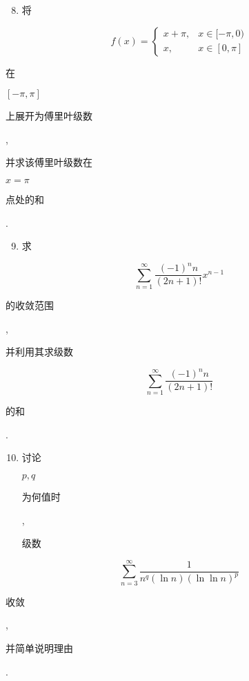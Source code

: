 \documentclass[10pt]{article}
\begin{document}
\begin{enumerate}
  \setcounter{enumi}{7}
  \item \begin{CJK}{UTF8}{mj}将\end{CJK}
\end{enumerate}
$$
f(x)= \begin{cases}x+\pi, & x \in[-\pi, 0) \\ x, & x \in[0, \pi]\end{cases}
$$
\begin{CJK}{UTF8}{mj}在\end{CJK} $[-\pi, \pi]$ \begin{CJK}{UTF8}{mj}上展开为傅里叶级数\end{CJK}, \begin{CJK}{UTF8}{mj}并求该傅里叶级数在\end{CJK} $x=\pi$ \begin{CJK}{UTF8}{mj}点处的和\end{CJK}.

\begin{enumerate}
  \setcounter{enumi}{8}
  \item \begin{CJK}{UTF8}{mj}求\end{CJK}
\end{enumerate}
$$
\sum_{n=1}^{\infty} \frac{(-1)^{n} n}{(2 n+1) !} x^{n-1}
$$
\begin{CJK}{UTF8}{mj}的收敛范围\end{CJK}, \begin{CJK}{UTF8}{mj}并利用其求级数\end{CJK}
$$
\sum_{n=1}^{\infty} \frac{(-1)^{n} n}{(2 n+1) !}
$$
\begin{CJK}{UTF8}{mj}的和\end{CJK}.

\begin{enumerate}
  \setcounter{enumi}{9}
  \item \begin{CJK}{UTF8}{mj}讨论\end{CJK} $p, q$ \begin{CJK}{UTF8}{mj}为何值时\end{CJK}, \begin{CJK}{UTF8}{mj}级数\end{CJK}
\end{enumerate}
$$
\sum_{n=3}^{\infty} \frac{1}{n^{q}(\ln n)(\ln \ln n)^{p}}
$$
\begin{CJK}{UTF8}{mj}收敛\end{CJK}, \begin{CJK}{UTF8}{mj}并简单说明理由\end{CJK}.
\end{document}
